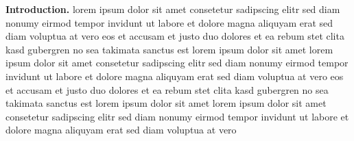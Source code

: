 \documentclass[11pt,letterpaper]{journal}
\title{\vspace*{-15mm}\mytitle\vspace*{-7mm}}\author{\me}\date{\today}
\begin{document}
{\bf Introduction.}
lorem ipsum dolor sit amet consetetur sadipscing elitr sed diam nonumy
eirmod tempor invidunt ut labore et dolore magna aliquyam erat sed diam
voluptua at vero eos et accusam et justo duo dolores et ea rebum stet clita
kasd gubergren no sea takimata sanctus est lorem ipsum dolor sit amet lorem
ipsum dolor sit amet consetetur sadipscing elitr sed diam nonumy eirmod
tempor invidunt ut labore et dolore\cite{article}
magna aliquyam erat sed diam voluptua at
vero eos et accusam et justo duo dolores et ea rebum stet clita kasd
gubergren no sea takimata sanctus est lorem ipsum dolor sit amet lorem ipsum
dolor sit amet consetetur sadipscing elitr sed diam nonumy eirmod tempor
invidunt ut labore et dolore magna aliquyam erat sed diam voluptua at vero

\vspace*{-9mm}
{\small
\renewcommand{\refname}{}


}
\end{document}
